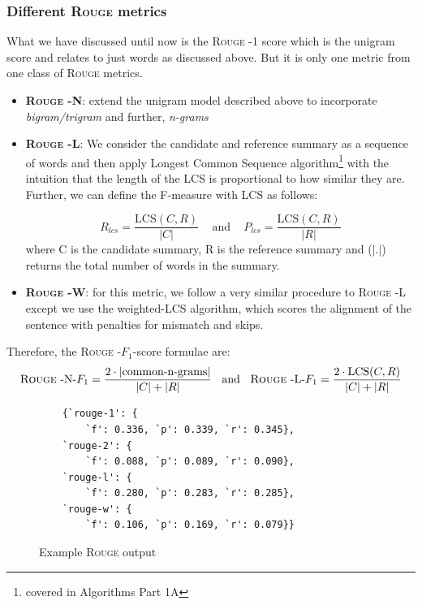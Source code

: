\documentclass[12pt,a4paper,twoside,openright]{report}
\newcommand{\rouge}{\textsc{Rouge} }
\newcommand{\fone}{$F_1$}
\begin{document}
\subsubsection{Different \rouge metrics}
What we have discussed until now is the \rouge-1 score which is the unigram score and relates to just words as discussed above. But it is only one metric from one class of \rouge metrics.
\begin{itemize}
    \item \textbf{\rouge-N}: extend the unigram model described above to incorporate \textit{bigram/trigram} and further, \textit{n-grams}
    \item \textbf{\rouge-L}: We consider the candidate and reference summary as a sequence of words and then apply Longest Common Sequence algorithm\footnote{covered in Algorithms Part 1A} with the intuition that the length of the LCS is proportional to how similar they are. Further, we can define the F-measure with LCS as follows:

    \begin{equation*}
        R_{lcs} = \frac{\text{LCS}(C, R)}{|C|}
        \;\;\;\text{ and }\;\;\;
        P_{lcs} = \frac{\text{LCS}(C, R)}{|R|}
    \end{equation*}
    where C is the candidate summary, R is the reference summary and ($|.|$) returns the total number of words in the summary.

    \item \textbf{\rouge-W}: for this metric, we follow a very similar procedure to \rouge-L except we use the weighted-LCS algorithm, which scores the alignment of the sentence with penalties for mismatch and skips.
\end{itemize}
Therefore, the \rouge-\fone-score formulae are:
\begin{equation}
    \text{\rouge-N-\fone} = \frac{2 \cdot | \text{common-n-grams} |}{|C| + |R|}
    \;\;\text{ and }\;\;
    \text{\rouge-L-\fone} = \frac{2 \cdot \text{LCS}(C, R)}{|C| + |R|}
    \label{eq:rouge-f1}
\end{equation}

\begin{figure}[H]

\begin{lstlisting}
    {`rouge-1': {
        `f': 0.336, `p': 0.339, `r': 0.345},
    `rouge-2': {
        `f': 0.088, `p': 0.089, `r': 0.090},
    `rouge-l': {
        `f': 0.280, `p': 0.283, `r': 0.285},
    `rouge-w': {
        `f': 0.106, `p': 0.169, `r': 0.079}}
\end{lstlisting}
\caption{Example \rouge output}
\label{lst:rouge-output}
\end{figure}
\end{document}
